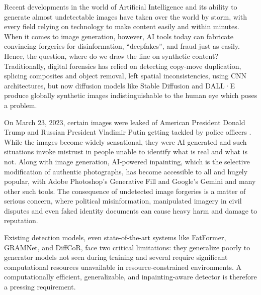 

Recent developments in the world of Artificial Intelligence and its
ability to generate almost undetectable images have taken over the
world by storm, with every field relying on technology to make
content easily and within minutes. When it comes to image generation,
however, AI tools today can fabricate convincing forgeries for
disinformation, ``deepfakes'', and fraud just as easily. Hence, the
question, where do we draw the line on synthetic content?
Traditionally, digital forensics has relied on detecting copy-move
duplication, splicing composites and object removal, left spatial
inconsistencies, using CNN architectures, but now diffusion models
like Stable Diffusion and DALL·E produce globally synthetic images
indistinguishable to the human eye which poses a problem.

On March 23, 2023, certain images were leaked of American President
Donald Trump and Russian President Vladimir Putin getting tackled by
police officers \cite{klepper2023deepfake}. While the images become
widely sensational, they were AI generated and such situations invoke
mistrust in people unable to identify what is real and what is not.
Along with image generation, AI-powered inpainting, which is the
selective modification of authentic photographs, has become
accessible to all and hugely popular, with Adobe Photoshop's
Generative Fill and Google's Gemini and many other such tools.
The consequence of undetected image forgeries is a matter of serious
concern, where political misinformation, manipulated imagery in civil
disputes and even faked identity documents can cause heavy harm and
damage to reputation.

Existing detection models, even state-of-the-art systems like
FatFormer, GRAMNet, and DiffCoR, face two critical limitations: they
generalize poorly to generator models not seen during training and
several require significant computational resources unavailable in
resource-constrained environments. A computationally efficient,
generalizable, and inpainting-aware detector is therefore a pressing
requirement.


